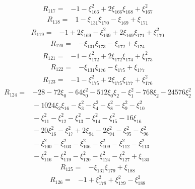 \[
\begin{aligned}
 R_{117}={}&-1-\xi_{166}^{2}+2\xi_{166}\xi_{168}+\xi_{167}^{2}
\end{aligned}
\]
\[
\begin{aligned}
 R_{118}={}&1-\xi_{131}\xi_{170}-\xi_{169}+\xi_{171}
\end{aligned}
\]
\[
\begin{aligned}
 R_{119}={}&-1+2\xi_{169}-\xi_{169}^{2}+2\xi_{169}\xi_{171}+\xi_{170}^{2}
\end{aligned}
\]
\[
\begin{aligned}
 R_{120}={}&-\xi_{131}\xi_{173}-\xi_{172}+\xi_{174}
\end{aligned}
\]
\[
\begin{aligned}
 R_{121}={}&-1-\xi_{172}^{2}+2\xi_{172}\xi_{174}+\xi_{173}^{2}
\end{aligned}
\]
\[
\begin{aligned}
 R_{122}={}&-\xi_{131}\xi_{176}-\xi_{175}+\xi_{177}
\end{aligned}
\]
\[
\begin{aligned}
 R_{123}={}&-1-\xi_{175}^{2}+2\xi_{175}\xi_{177}+\xi_{176}^{2}
\end{aligned}
\]
\[
\begin{aligned}
 R_{124}={}&-28-72\xi_{0}-64\xi_{0}^{2}-512\xi_{0}\xi_{2}-\xi_{1}^{2}-768\xi_{2}-24576\xi_{2}^{2}\\
 &{}-1024\xi_{2}\xi_{16}-\xi_{3}^{2}-\xi_{4}^{2}-\xi_{8}^{2}-\xi_{9}^{2}-\xi_{10}^{2}\\
 &{}-\xi_{11}^{2}-\xi_{12}^{2}-\xi_{13}^{2}-\xi_{14}^{2}-\xi_{15}^{2}-16\xi_{16}\\
 &{}-20\xi_{16}^{2}-\xi_{17}^{2}+2\xi_{94}-2\xi_{94}^{2}-\xi_{95}^{2}-\xi_{96}^{2}\\
 &{}-\xi_{100}^{2}-\xi_{103}^{2}-\xi_{106}^{2}-\xi_{109}^{2}-\xi_{112}^{2}-\xi_{113}^{2}\\
 &{}-\xi_{116}^{2}-\xi_{119}^{2}-\xi_{120}^{2}-\xi_{124}^{2}-\xi_{127}^{2}+\xi_{130}
\end{aligned}
\]
\[
\begin{aligned}
 R_{125}={}&-\xi_{131}\xi_{179}+\xi_{188}
\end{aligned}
\]
\[
\begin{aligned}
 R_{126}={}&-1+\xi_{178}^{2}+\xi_{179}^{2}-\xi_{188}^{2}
\end{aligned}
\]
